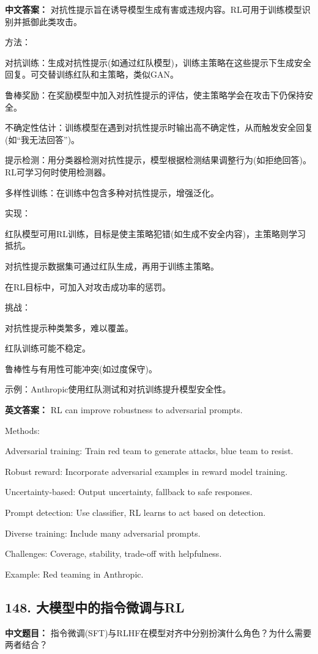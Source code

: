 \documentclass[10pt,a4paper]{ctexart}
\begin{document}
\textbf{中文答案：}
对抗性提示旨在诱导模型生成有害或违规内容。RL可用于训练模型识别并抵御此类攻击。

方法：

对抗训练：生成对抗性提示(如通过红队模型)，训练主策略在这些提示下生成安全回复。可交替训练红队和主策略，类似GAN。

鲁棒奖励：在奖励模型中加入对抗性提示的评估，使主策略学会在攻击下仍保持安全。

不确定性估计：训练模型在遇到对抗性提示时输出高不确定性，从而触发安全回复(如“我无法回答”)。

提示检测：用分类器检测对抗性提示，模型根据检测结果调整行为(如拒绝回答)。RL可学习何时使用检测器。

多样性训练：在训练中包含多种对抗性提示，增强泛化。

实现：

红队模型可用RL训练，目标是使主策略犯错(如生成不安全内容)，主策略则学习抵抗。

对抗性提示数据集可通过红队生成，再用于训练主策略。

在RL目标中，可加入对攻击成功率的惩罚。

挑战：

对抗性提示种类繁多，难以覆盖。

红队训练可能不稳定。

鲁棒性与有用性可能冲突(如过度保守)。

示例：Anthropic使用红队测试和对抗训练提升模型安全性。

\textbf{英文答案：}
RL can improve robustness to adversarial prompts.

Methods:

Adversarial training: Train red team to generate attacks, blue team to resist.

Robust reward: Incorporate adversarial examples in reward model training.

Uncertainty-based: Output uncertainty, fallback to safe responses.

Prompt detection: Use classifier, RL learns to act based on detection.

Diverse training: Include many adversarial prompts.

Challenges: Coverage, stability, trade-off with helpfulness.

Example: Red teaming in Anthropic.

\subsection*{148. 大模型中的指令微调与RL}
\textbf{中文题目：} 指令微调(SFT)与RLHF在模型对齐中分别扮演什么角色？为什么需要两者结合？
\end{document}
